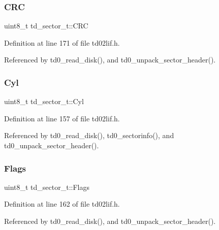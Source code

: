 \subsubsection{\texorpdfstring{C\+RC}{CRC}}
{\footnotesize\ttfamily uint8\+\_\+t td\+\_\+sector\+\_\+t\+::\+C\+RC}



Definition at line 171 of file td02lif.\+h.



Referenced by td0\+\_\+read\+\_\+disk(), and td0\+\_\+unpack\+\_\+sector\+\_\+header().

\mbox{\label{structtd__sector__t_afddd9f1e3a41cc6e3a9be2478cd3305b}} 
\subsubsection{\texorpdfstring{Cyl}{Cyl}}
{\footnotesize\ttfamily uint8\+\_\+t td\+\_\+sector\+\_\+t\+::\+Cyl}



Definition at line 157 of file td02lif.\+h.



Referenced by td0\+\_\+read\+\_\+disk(), td0\+\_\+sectorinfo(), and td0\+\_\+unpack\+\_\+sector\+\_\+header().

\mbox{\label{structtd__sector__t_ad30cfc0c6589ff25f8456ada5b352efa}} 
\subsubsection{\texorpdfstring{Flags}{Flags}}
{\footnotesize\ttfamily uint8\+\_\+t td\+\_\+sector\+\_\+t\+::\+Flags}



Definition at line 162 of file td02lif.\+h.



Referenced by td0\+\_\+read\+\_\+disk(), and td0\+\_\+unpack\+\_\+sector\+\_\+header().

\mbox{\label{structtd__sector__t_a703252220f745cd6adfedadd5cc993d6}} 
